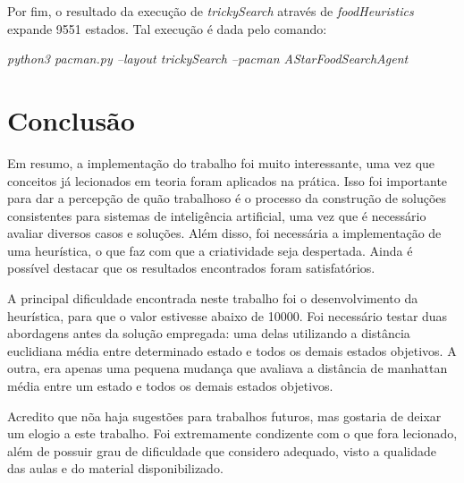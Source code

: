 \documentclass[12pt]{article}
\begin{document}
Por fim, o resultado da execução de \textit{trickySearch} através de
\textit{foodHeuristics} expande 9551 estados.
Tal execução é dada pelo comando:
\begin{center}
  \textit{python3 pacman.py --layout trickySearch --pacman AStarFoodSearchAgent}
\end{center}

\section{Conclusão}
Em resumo, a implementação do trabalho foi muito interessante, uma vez que
conceitos já lecionados em teoria foram aplicados na prática.
Isso foi importante para dar a percepção de quão trabalhoso é o processo da
construção de soluções consistentes para sistemas de inteligência artificial,
uma vez que é necessário avaliar diversos casos e soluções.
Além disso, foi necessária a implementação de uma heurística, o que faz com que
a criatividade seja despertada.
Ainda é possível destacar que os resultados encontrados foram satisfatórios.

A principal dificuldade encontrada neste trabalho foi o desenvolvimento da
heurística, para que o valor estivesse abaixo de 10000.
Foi necessário testar duas abordagens antes da solução empregada:
uma delas utilizando a distância euclidiana média entre determinado estado e
todos os demais estados objetivos.
A outra, era apenas uma pequena mudança que avaliava a distância de manhattan
média entre um estado e todos os demais estados objetivos.

Acredito que nõa haja sugestões para trabalhos futuros, mas gostaria de deixar
um elogio a este trabalho.
Foi extremamente condizente com o que fora lecionado, além de possuir grau
de dificuldade que considero adequado, visto a qualidade das aulas e do
material disponibilizado.






\end{document}
